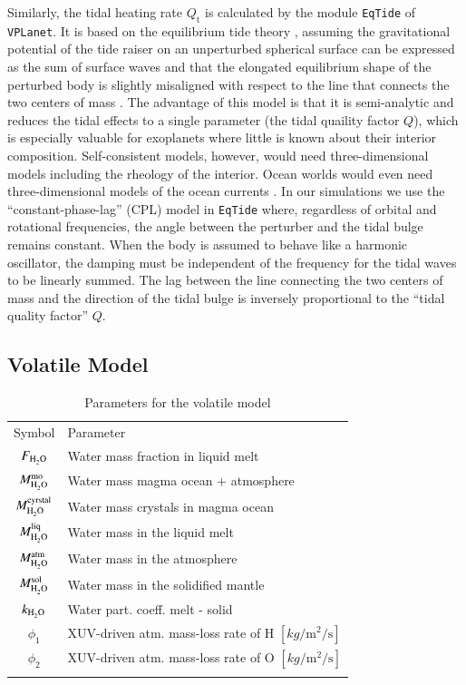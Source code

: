 \documentclass[paper=letterpaper,fontsize=12pt,oneside,twocolumn]{article}
\newcommand{\vplanet}{\texttt{\footnotesize{VPLanet}}}
\newcommand{\eqtide}{\texttt{\footnotesize{EqTide}}}
\begin{document}
Similarly, the tidal heating rate $Q_\mathrm{t}$ is calculated by the module \eqtide{} of \vplanet{}.
It is based on the equilibrium tide theory \citep{Darwin1880,Ferraz-Mello2008,Leconte2010}, assuming the gravitational potential of the tide raiser on an unperturbed spherical surface can be expressed as the sum of surface waves and that the elongated equilibrium shape of the perturbed body is slightly misaligned with respect to the line that connects the two centers of mass \citep{Barnes2020}.
The advantage of this model is that it is semi-analytic and reduces the tidal effects to a single parameter (the tidal quaility factor $Q$), which is especially valuable for exoplanets where little is known about their interior composition.
Self-consistent models, however, would need three-dimensional models including the rheology of the interior.
Ocean worlds would even need three-dimensional models of the ocean currents \citep{Carone2012}.
In our simulations we use the ``constant-phase-lag'' (CPL) model in \eqtide{} where, regardless of orbital and rotational frequencies, the angle between the perturber and the tidal bulge remains constant.
When the body is assumed to behave like a harmonic oscillator, the damping must be independent of the frequency for the tidal waves to be linearly summed.
The lag between the line connecting the two centers of mass and the direction of the tidal bulge is inversely proportional to the ``tidal quality factor'' $Q$.

\subsection{Volatile Model}
\label{sec_vol_model}

\begin{table}[h]
	\caption[Parameters volatile model]{Parameters for the volatile model}
	\begin{tabular}{cl}
		\noalign{\smallskip}
		\hline
		\noalign{\smallskip}
		Symbol & Parameter \\ 
		\noalign{\smallskip}
		\hline \hline
		\noalign{\smallskip}
		$F_{\ce{H2O}}$ & Water mass fraction in liquid melt \\ 
		$M_{\ce{H2O}}^{\mathrm{mo}} $ & Water mass magma ocean + atmosphere \\
		$M_{\ce{H2O}}^{\mathrm{cyrstal}} $ & Water mass crystals in magma ocean \\
		$M_{\ce{H2O}}^{\mathrm{liq}} $ & Water mass in the liquid melt \\
		$M_{\ce{H2O}}^{\mathrm{atm}} $ & Water mass in the atmosphere \\
		$M_{\ce{H2O}}^{\mathrm{sol}} $ & Water mass in the solidified mantle \\
		$k_{\ce{H2O}}$ & Water part. coeff. melt - solid \\
		$\phi_1$ & XUV-driven atm. mass-loss rate of H $[\si{kg\per\metre\squared\per\second}]$\\
		$\phi_2$ & XUV-driven atm. mass-loss rate of O $[\si{kg\per\metre\squared\per\second}]$\\
		\noalign{\smallskip}
		\hline
	\end{tabular}
	\label{Tab_Volat_Model}
\end{table}
\end{document}
